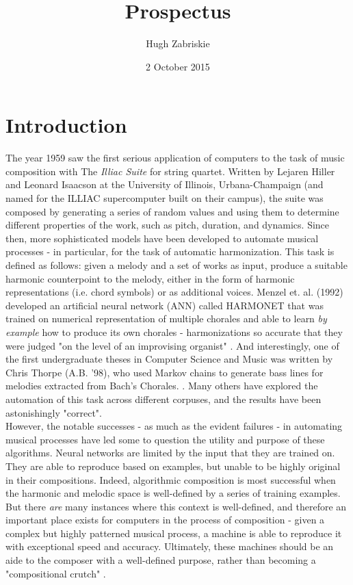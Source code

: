 \documentclass[11pt]{article}
\title{Prospectus}
\author{Hugh Zabriskie}
\date{2 October 2015}
\begin{document}
\maketitle{}
\section{Introduction}

The year 1959 saw the first serious application of computers to the task of music composition with The \textit{Illiac Suite} for string quartet. Written by Lejaren Hiller and Leonard Isaacson at the University of Illinois, Urbana-Champaign (and named for the ILLIAC supercomputer built on their campus), the suite was composed by generating a series of random values and using them to determine different properties of the work, such as pitch, duration, and dynamics. Since then, more sophisticated models have been developed to automate musical processes - in particular, for the task of automatic harmonization. This task is defined as follows: given a melody and a set of works as input, produce a suitable harmonic counterpoint to the melody, either in the form of harmonic representations (i.e. chord symbols) or as additional voices. Menzel et. al. (1992) developed an artificial neural network (ANN) called HARMONET that was trained on numerical representation of multiple chorales and able to learn \textit{by example} how to produce its own chorales - harmonizations so accurate that they were judged "on the level of an improvising organist" \cite{hild1992harmonet}. And interestingly, one of the first undergraduate theses in Computer Science and Music was written by Chris Thorpe (A.B. '98), who used Markov chains to generate bass lines for melodies extracted from Bach's Chorales. \cite{thorpe1998bach}. Many others have explored the automation of this task across different corpuses, and the results have been astonishingly "correct". \\

However, the notable successes - as much as the evident failures - in automating musical processes have led some to question the utility and purpose of these algorithms. Neural networks are limited by the input that they are trained on. They are able to reproduce based on examples, but unable to be highly original in their compositions. Indeed, algorithmic composition is most successful when the harmonic and melodic space is well-defined by a series of training examples. But there \textit{are} many instances where this context is well-defined, and therefore an important place exists for computers in the process of composition - given a complex but highly patterned musical process, a machine is able to reproduce it with exceptional speed and accuracy. Ultimately, these machines should be an aide to the composer with a well-defined purpose, rather than becoming a "compositional crutch" \cite{jacob1996creativity}.
\end{document}
